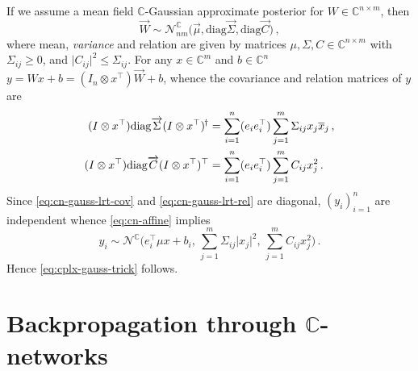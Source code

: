 \documentclass[a4paper,10pt,twocolumn]{article}
\newcommand{\cplx}{\mathbb{C}}
\newcommand{\hop}{{\mkern-1.5mu\dagger}}
\newcommand{\conj}[1]{\overline{#1}}
\renewcommand{\vec}[1]{\overrightarrow{#1}}
\newcommand{\diag}[1]{\mathrm{diag}{#1}}
\begin{document}
If we assume a mean field $\cplx$-Gaussian approximate posterior for $
  W \in \cplx^{n\times m}
$, then
\begin{equation}  \label{eq:c-gauss-vi-general-vec}
  \vec{W}
    \sim \mathcal{N}^{\cplx}_{nm} \bigl(
      \vec{\mu}, \diag{\vec{\Sigma}}, \diag{\vec{C}}
    \bigr)
  \,,
\end{equation}
where mean, \emph{variance} and relation are given by matrices $
  \mu, \Sigma, C \in \cplx^{n\times m}
$ with $\Sigma_{ij} \geq 0$, and $
  \lvert C_{ij} \rvert^2 \leq \Sigma_{ij}
$. For any $x \in \cplx^m$ and $b\in \cplx^n$ $
  y = W x + b
    = (I_n \otimes x^\top) \vec{W} + b
$, whence the covariance and relation matrices of $y$ are
\begin{align}
  (I \otimes x^\top) \diag{\vec{\Sigma}} (I \otimes x^\top)^{\hop}
    & = \sum_{i=1}^n (e_i e_i^\top) \sum_{j=1}^m \Sigma_{ij} x_j \conj{x}_j
    \,,  \label{eq:cn-gauss-lrt-cov} \\
  (I \otimes x^\top) \diag{\vec{C}} (I \otimes x^\top)^\top
    & = \sum_{i=1}^n (e_i e_i^\top) \sum_{j=1}^m C_{ij} x_j^2
    \,.  \label{eq:cn-gauss-lrt-rel}
\end{align}
Since \eqref{eq:cn-gauss-lrt-cov} and \eqref{eq:cn-gauss-lrt-rel} are diagonal, $(y_i)_{i=1}^n$
are independent whence \eqref{eq:cn-affine} implies
\begin{equation}  \label{eq:cplx-gauss-trick-appendix}
  y_i
    \sim \mathcal{N}^{\cplx}
      \bigl(
        e_i^\top \mu x + b_i,
        \, \sum_{j=1}^m \Sigma_{ij} \lvert x_j \rvert^2,
        \, \sum_{j=1}^m C_{ij} x_j^2
      \bigr)
    \,.
\end{equation}
Hence \eqref{eq:cplx-gauss-trick} follows.


\section{Backpropagation through $\cplx$-networks} %
\label{sub:wirtinger_calculus}
\end{document}
